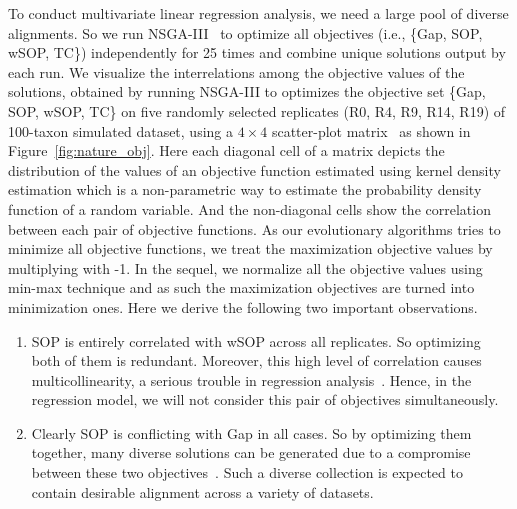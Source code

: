 To conduct multivariate linear regression analysis, we need a large pool of diverse alignments. So we run NSGA-III~\citep{deb2014evolutionary} to optimize all objectives (i.e., \{Gap, SOP, wSOP, TC\}) independently for 25 times and combine unique solutions output by each run. %
We visualize the interrelations among the objective values of the solutions, obtained by running NSGA-III to optimizes the objective set \{Gap, SOP, wSOP, TC\} on five randomly selected replicates (R0, R4, R9, R14, R19) of 100-taxon simulated dataset, using a $ 4\times4 $ scatter-plot matrix~\cite{kalyanmoy2001multi} as shown in Figure~\ref{fig:nature_obj}. Here each diagonal cell of a matrix depicts the distribution of the values of an objective function estimated using kernel density estimation which is a non-parametric way to estimate the probability density function of a random variable. And the non-diagonal cells show the correlation between each pair of objective functions. As our evolutionary algorithms tries to minimize all objective functions, we treat the maximization objective values by multiplying with -1. In the sequel, we normalize all the objective values using min-max technique and as such the maximization objectives are turned into minimization ones.
Here we derive the following two important observations.
\begin{enumerate}
	
	\item SOP is entirely correlated with wSOP across all replicates. So optimizing both of them is redundant. Moreover, this high level of correlation causes multicollinearity, a serious trouble in regression analysis~\citep{montgomery2012introduction}. Hence, in the regression model, we will not consider this pair of objectives simultaneously.  
	
	\item Clearly SOP is conflicting with Gap in all cases. So by optimizing them together, many diverse solutions can be generated due to a compromise between these two objectives~\citep{kalyanmoy2001multi}. Such a diverse collection is expected to contain desirable alignment across a variety of datasets.
	
\end{enumerate}

